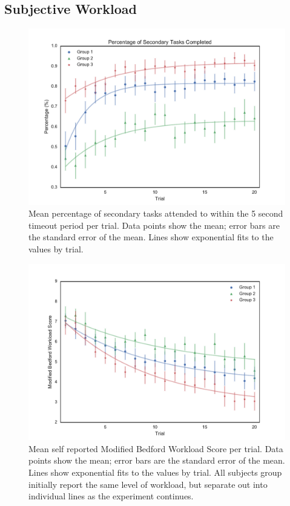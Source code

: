 \documentclass[]{aiaa-tc}%
\begin{document}
\subsection{Subjective Workload}

\begin{figure}[tb!]
  \centering
  \includegraphics[width=0.825\linewidth]{figs/Group_Percentage_fit_30.pdf}
  \caption[Mean percentage of secondary tasks attended to within the 5 second timeout period per trial]{Mean percentage of secondary tasks attended to within the 5 second timeout period per trial. Data points show the mean; error bars are the standard error of the mean. Lines show exponential fits to the values by trial.}
  \label{fig:secondary}
  \vspace{1em}
\end{figure}

\begin{figure}[tb!]
  \centering
  \includegraphics[width=0.8\linewidth]{figs/Group_workload_fit_30.pdf}
  \caption[Mean self reported Modified Bedford Workload Score per trial]{Mean self reported Modified Bedford Workload Score per trial. Data points show the mean; error bars are the standard error of the mean. Lines show exponential fits to the values by trial. All subjects group initially report the same level of workload, but separate out into individual lines as the experiment continues.
  }
  \label{fig:workload}
\end{figure}
\end{document}
